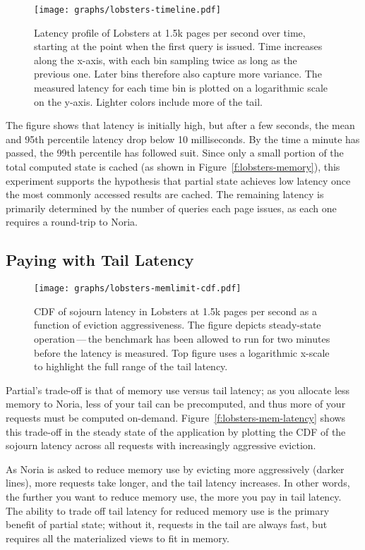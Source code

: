 \begin{figure}[t]
  \centering
  \texttt{[image: graphs/lobsters-timeline.pdf]}
  \caption{Latency profile of Lobsters at 1.5k pages per second over time,
  starting at the point when the first query is issued. Time increases along the
  x-axis, with each bin sampling twice as long as the previous one. Later bins
  therefore also capture more variance. The measured latency for each time bin
  is plotted on a logarithmic scale on the y-axis. Lighter colors include more
  of the tail.} \label{f:lobsters-timeline}
\end{figure}

The figure shows that latency is initially high, but after a few seconds, the
mean and 95th percentile latency drop below 10 milliseconds. By the time a
minute has passed, the 99th percentile has followed suit. Since only a small
portion of the total computed state is cached (as shown in
Figure~\vref{f:lobsters-memory}), this experiment supports the hypothesis that
partial state achieves low latency once the most commonly accessed results are
cached. The remaining latency is primarily determined by the number of queries
each page issues, as each one requires a round-trip to Noria.

\subsection{Paying with Tail Latency}

\begin{figure}[h]
  \centering
  \texttt{[image: graphs/lobsters-memlimit-cdf.pdf]}
  \caption{CDF of sojourn latency in Lobsters at 1.5k pages per second as
  a function of eviction aggressiveness. The figure depicts steady-state
  operation\,---\,the benchmark has been allowed to run for two minutes before
  the latency is measured. Top figure uses a logarithmic x-scale to highlight
  the full range of the tail latency.}
  \label{f:lobsters-mem-latency}
\end{figure}

Partial's trade-off is that of memory use versus tail latency; as you allocate
less memory to Noria, less of your tail can be precomputed, and thus more of
your requests must be computed on-demand. Figure~\vref{f:lobsters-mem-latency}
shows this trade-off in the steady state of the application by plotting the CDF
of the sojourn latency across all requests with increasingly aggressive
eviction.

As Noria is asked to reduce memory use by evicting more aggressively (darker
lines), more requests take longer, and the tail latency increases. In other
words, the further you want to reduce memory use, the more you pay in tail
latency. The ability to trade off tail latency for reduced memory use is the
primary benefit of partial state; without it, requests in the tail are always
fast, but requires all the materialized views to fit in memory.

